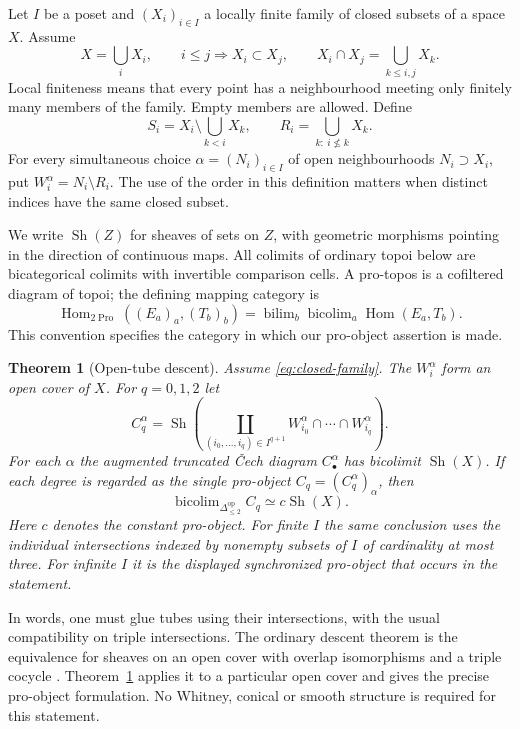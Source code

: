 \documentclass[11pt,a4paper]{article}
\newtheorem{theorem}{Theorem}[section]
\theoremstyle{definition}
\newcommand{\Sh}{\operatorname{Sh}}
\newcommand{\Hom}{\operatorname{Hom}}
\newcommand{\Pro}{\operatorname{Pro}}
\begin{document}
Let $I$ be a poset and $(X_i)_{i\in I}$ a locally finite family of closed subsets of a space $X$. Assume
\begin{equation}\label{eq:closed-family}
 X=\bigcup_iX_i,\qquad i\le j\Longrightarrow X_i\subset X_j,
 \qquad X_i\cap X_j=\bigcup_{k\le i,j}X_k.
\end{equation}
Local finiteness means that every point has a neighbourhood meeting only finitely many members of the family. Empty members are allowed. Define
\[
 S_i=X_i\setminus\bigcup_{k<i}X_k,
 \qquad R_i=\bigcup_{k:\ i\nleq k}X_k.
\]
For every simultaneous choice $\alpha=(N_i)_{i\in I}$ of open neighbourhoods $N_i\supset X_i$, put $W_i^\alpha=N_i\setminus R_i$. The use of the order in this definition matters when distinct indices have the same closed subset.

We write $\Sh(Z)$ for sheaves of sets on $Z$, with geometric morphisms pointing in the direction of continuous maps. All colimits of ordinary topoi below are bicategorical colimits with invertible comparison cells. A pro-topos is a cofiltered diagram of topoi; the defining mapping category is
\begin{equation}\label{eq:pro-maps}
 \Hom_{2\Pro}((E_a)_a,(T_b)_b)
 =\mathop{\mathrm{bilim}}_b\mathop{\mathrm{bicolim}}_a\Hom(E_a,T_b).
\end{equation}
This convention specifies the category in which our pro-object assertion is made.

\begin{theorem}[Open-tube descent]\label{thm:tubes}
Assume \eqref{eq:closed-family}. The $W_i^\alpha$ form an open cover of $X$. For $q=0,1,2$ let
\[
 C_q^\alpha=\Sh\!\left(\coprod_{(i_0,\ldots,i_q)\in I^{q+1}}
 W_{i_0}^\alpha\cap\cdots\cap W_{i_q}^\alpha\right).
\]
For each $\alpha$ the augmented truncated \v Cech diagram $C_\bullet^\alpha$ has bicolimit $\Sh(X)$. If each degree is regarded as the single pro-object $C_q=(C_q^\alpha)_\alpha$, then
\[
 \mathop{\mathrm{bicolim}}_{\Delta_{\le2}^{\mathrm{op}}}C_q
 \simeq c\Sh(X).
\]
Here $c$ denotes the constant pro-object. For finite $I$ the same conclusion uses the individual intersections indexed by nonempty subsets of $I$ of cardinality at most three. For infinite $I$ it is the displayed synchronized pro-object that occurs in the statement.
\end{theorem}

In words, one must glue tubes using their intersections, with the usual compatibility on triple intersections. The ordinary descent theorem is the equivalence for sheaves on an open cover with overlap isomorphisms and a triple cocycle \cite[Lemmas~6.33.2 and~6.33.4, Tags~00AL and~00AN]{StacksGluing}. Theorem~\ref{thm:tubes} applies it to a particular open cover and gives the precise pro-object formulation. No Whitney, conical or smooth structure is required for this statement.
\end{document}
